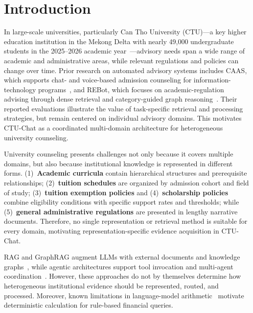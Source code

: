 \section{Introduction}
\label{sec:intro}

In large-scale universities, particularly Can Tho University (CTU)—a key higher education institution in the Mekong Delta with nearly 49,000 undergraduate students in the 2025--2026 academic year~\cite{ctu2025opening}—advisory needs span a wide range of academic and administrative areas, while relevant regulations and policies can change over time. Prior research on automated advisory systems includes CAAS, which supports chat- and voice-based admission counseling for information-technology programs~\cite{ma2023caas}, and REBot, which focuses on academic-regulation advising through dense retrieval and category-guided graph reasoning~\cite{ma2025rebot}. Their reported evaluations illustrate the value of task-specific retrieval and processing strategies, but remain centered on individual advisory domains. This motivates CTU-Chat as a coordinated multi-domain architecture for heterogeneous university counseling.

University counseling presents challenges not only because it covers multiple domains, but also because institutional knowledge is represented in different forms. (1)~\textbf{Academic curricula} contain hierarchical structures and prerequisite relationships; (2)~\textbf{tuition schedules} are organized by admission cohort and field of study; (3)~\textbf{tuition exemption policies} and (4)~\textbf{scholarship policies} combine eligibility conditions with specific support rates and thresholds; while (5)~\textbf{general administrative regulations} are presented in lengthy narrative documents. Therefore, no single representation or retrieval method is suitable for every domain, motivating representation-specific evidence acquisition in CTU-Chat.

RAG and GraphRAG augment LLMs with external documents and knowledge graphs~\cite{lewis2020rag,gao2023rag_survey,edge2024graphrag}, while agentic architectures support tool invocation and multi-agent coordination~\cite{yao2023react,wu2023autogen,schick2023toolformer}. However, these approaches do not by themselves determine how heterogeneous institutional evidence should be represented, routed, and processed. Moreover, known limitations in language-model arithmetic~\cite{qian2023limitations} motivate deterministic calculation for rule-based financial queries.

